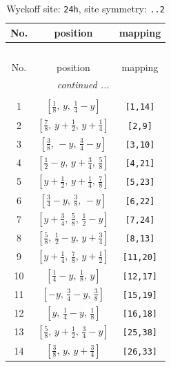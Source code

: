 \documentclass[fleqn,8pt]{jsarticle}
\begin{document}
\renewcommand{\arraystretch}{1.2}
\begin{longtable}{ccc}
\caption{Wyckoff site: {\tt 24h}, site symmetry: {\tt ..2}}
 \\
 \hline \hline
No. & position & mapping \\ \hline \endfirsthead

\multicolumn{2}{l}{\tablename\ \thetable{}} \\
 \hline \hline
No. & position & mapping \\ \hline \endhead

 \hline \hline
\multicolumn{2}{r}{\footnotesize\it continued ...} \\ \endfoot

 \hline \hline
\multicolumn{2}{r}{} \\ \endlastfoot

1 & $\left[ \frac{1}{8},\, y,\, \frac{1}{4} - y \right]$ & {\tt [1,14]} \\ \hline
2 & $\left[ \frac{7}{8},\, y + \frac{1}{2},\, y + \frac{1}{4} \right]$ & {\tt [2,9]} \\ \hline
3 & $\left[ \frac{3}{8},\, - y,\, \frac{3}{4} - y \right]$ & {\tt [3,10]} \\ \hline
4 & $\left[ \frac{1}{2} - y,\, y + \frac{3}{4},\, \frac{5}{8} \right]$ & {\tt [4,21]} \\ \hline
5 & $\left[ y + \frac{1}{2},\, y + \frac{1}{4},\, \frac{7}{8} \right]$ & {\tt [5,23]} \\ \hline
6 & $\left[ \frac{3}{4} - y,\, \frac{3}{8},\, - y \right]$ & {\tt [6,22]} \\ \hline
7 & $\left[ y + \frac{3}{4},\, \frac{5}{8},\, \frac{1}{2} - y \right]$ & {\tt [7,24]} \\ \hline
8 & $\left[ \frac{5}{8},\, \frac{1}{2} - y,\, y + \frac{3}{4} \right]$ & {\tt [8,13]} \\ \hline
9 & $\left[ y + \frac{1}{4},\, \frac{7}{8},\, y + \frac{1}{2} \right]$ & {\tt [11,20]} \\ \hline
10 & $\left[ \frac{1}{4} - y,\, \frac{1}{8},\, y \right]$ & {\tt [12,17]} \\ \hline
11 & $\left[ - y,\, \frac{3}{4} - y,\, \frac{3}{8} \right]$ & {\tt [15,19]} \\ \hline
12 & $\left[ y,\, \frac{1}{4} - y,\, \frac{1}{8} \right]$ & {\tt [16,18]} \\ \hline
13 & $\left[ \frac{5}{8},\, y + \frac{1}{2},\, \frac{3}{4} - y \right]$ & {\tt [25,38]} \\ \hline
14 & $\left[ \frac{3}{8},\, y,\, y + \frac{3}{4} \right]$ & {\tt [26,33]} \\ \hline

\end{longtable}
\end{document}
